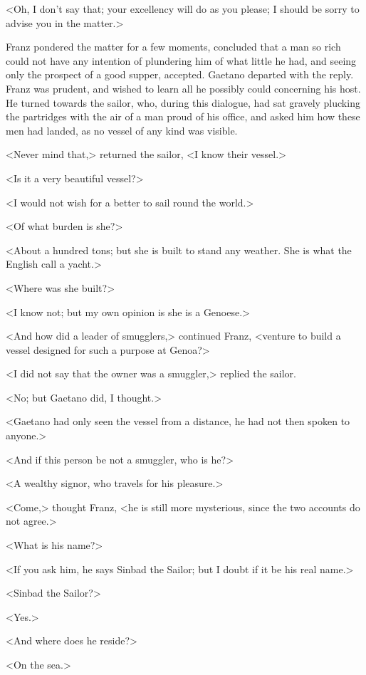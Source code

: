  <Oh, I don't say that; your excellency will do as you please; I should be sorry to advise you in the matter.> 

 Franz pondered the matter for a few moments, concluded that a man so rich could not have any intention of plundering him of what little he had, and seeing only the prospect of a good supper, accepted. Gaetano departed with the reply. Franz was prudent, and wished to learn all he possibly could concerning his host. He turned towards the sailor, who, during this dialogue, had sat gravely plucking the partridges with the air of a man proud of his office, and asked him how these men had landed, as no vessel of any kind was visible. 

 <Never mind that,> returned the sailor, <I know their vessel.> 

 <Is it a very beautiful vessel?> 

 <I would not wish for a better to sail round the world.> 

 <Of what burden is she?> 

 <About a hundred tons; but she is built to stand any weather. She is what the English call a yacht.> 

 <Where was she built?> 

 <I know not; but my own opinion is she is a Genoese.> 

 <And how did a leader of smugglers,> continued Franz, <venture to build a vessel designed for such a purpose at Genoa?> 

 <I did not say that the owner was a smuggler,> replied the sailor. 

 <No; but Gaetano did, I thought.> 

 <Gaetano had only seen the vessel from a distance, he had not then spoken to anyone.> 

 <And if this person be not a smuggler, who is he?> 

 <A wealthy signor, who travels for his pleasure.> 

 <Come,> thought Franz, <he is still more mysterious, since the two accounts do not agree.> 

 <What is his name?> 

 <If you ask him, he says Sinbad the Sailor; but I doubt if it be his real name.> 

 <Sinbad the Sailor?> 

 <Yes.> 

 <And where does he reside?> 

 <On the sea.> 

